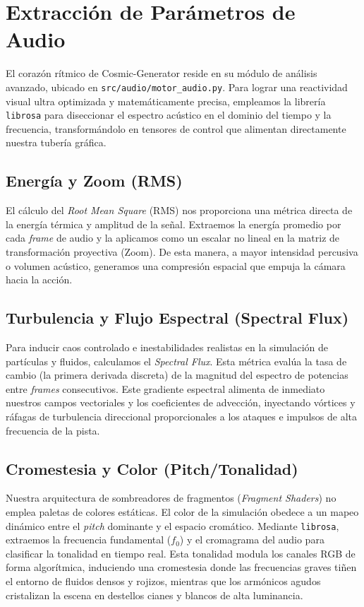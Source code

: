 \documentclass[12pt]{article}
\begin{document}
\section{Extracción de Parámetros de Audio}
\label{sec:extraccion_audio}

El corazón rítmico de Cosmic-Generator reside en su módulo de análisis avanzado, ubicado en \texttt{src/audio/motor\_audio.py}. Para lograr una reactividad visual ultra optimizada y matemáticamente precisa, empleamos la librería \texttt{librosa} para diseccionar el espectro acústico en el dominio del tiempo y la frecuencia, transformándolo en tensores de control que alimentan directamente nuestra tubería gráfica.

\subsection{Energía y Zoom (RMS)}
El cálculo del \textit{Root Mean Square} (RMS) nos proporciona una métrica directa de la energía térmica y amplitud de la señal.
Extraemos la energía promedio por cada \textit{frame} de audio y la aplicamos como un escalar no lineal en la matriz de transformación proyectiva (Zoom). De esta manera, a mayor intensidad percusiva o volumen acústico, generamos una compresión espacial que empuja la cámara hacia la acción.

\subsection{Turbulencia y Flujo Espectral (Spectral Flux)}
Para inducir caos controlado e inestabilidades realistas en la simulación de partículas y fluidos, calculamos el \textit{Spectral Flux}. Esta métrica evalúa la tasa de cambio (la primera derivada discreta) de la magnitud del espectro de potencias entre \textit{frames} consecutivos.
Este gradiente espectral alimenta de inmediato nuestros campos vectoriales y los coeficientes de advección, inyectando vórtices y ráfagas de turbulencia direccional proporcionales a los ataques e impulsos de alta frecuencia de la pista.

\subsection{Cromestesia y Color (Pitch/Tonalidad)}
Nuestra arquitectura de sombreadores de fragmentos (\textit{Fragment Shaders}) no emplea paletas de colores estáticas. El color de la simulación obedece a un mapeo dinámico entre el \textit{pitch} dominante y el espacio cromático.
Mediante \texttt{librosa}, extraemos la frecuencia fundamental ($f_0$) y el cromagrama del audio para clasificar la tonalidad en tiempo real. Esta tonalidad modula los canales RGB de forma algorítmica, induciendo una cromestesia donde las frecuencias graves tiñen el entorno de fluidos densos y rojizos, mientras que los armónicos agudos cristalizan la escena en destellos cianes y blancos de alta luminancia.
\end{document}
